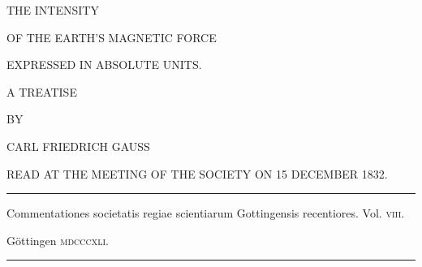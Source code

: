 \clearpage
\thispagestyle{empty}
\begin{center}
\vspace*{.6in}
{\large THE INTENSITY\par}
\bigskip
{\Large OF THE EARTH'S MAGNETIC FORCE\par}
\bigskip
{\large EXPRESSED IN ABSOLUTE UNITS.\par}
\vspace{.4in}
A TREATISE\par
\vspace{.4in}
{\small BY\par}
\bigskip
CARL FRIEDRICH GAUSS\par
\vspace{.4in}
{\small READ AT THE MEETING OF THE SOCIETY ON 15 DECEMBER 1832.\par}
\vfill
\rule{.8\textwidth}{.3pt}\par
\medskip
{\small Commentationes societatis regiae scientiarum Gottingensis recentiores. Vol. \textsc{viii}.\par}
Göttingen \textsc{mdcccxli}.\par
\medskip
\rule{.8\textwidth}{.3pt}\par
\end{center}
\clearpage
